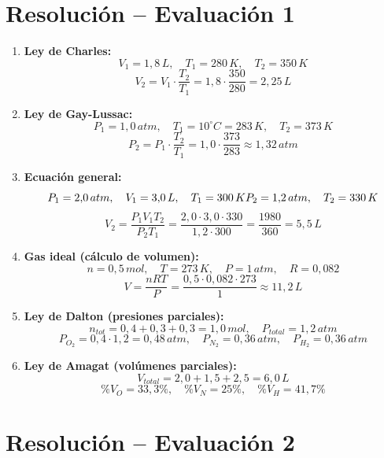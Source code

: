 \documentclass[a4paper,12pt]{article}
\begin{document}
\section*{Resolución – Evaluación 1}

\begin{enumerate}
\item \textbf{Ley de Charles:}
\[
V_1 = 1{,}8\,L,\quad T_1 = 280\,K,\quad T_2 = 350\,K
\]
\[
V_2 = V_1 \cdot \frac{T_2}{T_1} = 1{,}8 \cdot \frac{350}{280} = 2{,}25\,L
\]

\item \textbf{Ley de Gay-Lussac:}
\[
P_1 = 1{,}0\,atm,\quad T_1 = 10^\circ C = 283\,K,\quad T_2 = 373\,K
\]
\[
P_2 = P_1 \cdot \frac{T_2}{T_1} = 1{,}0 \cdot \frac{373}{283} \approx 1{,}32\,atm
\]

\item \textbf{Ecuación general:}
\[
P_1 = 2{,}0\,atm,\quad V_1 = 3{,}0\,L,\quad T_1 = 300\,K\\
P_2 = 1{,}2\,atm,\quad T_2 = 330\,K
\]
\[
V_2 = \frac{P_1 V_1 T_2}{P_2 T_1}
= \frac{2{,}0 \cdot 3{,}0 \cdot 330}{1{,}2 \cdot 300} = \frac{1980}{360} = 5{,}5\,L
\]

\item \textbf{Gas ideal (cálculo de volumen):}
\[
n = 0{,}5\,mol,\quad T = 273\,K,\quad P = 1\,atm,\quad R = 0{,}082
\]
\[
V = \frac{nRT}{P} = \frac{0{,}5 \cdot 0{,}082 \cdot 273}{1} \approx 11{,}2\,L
\]

\item \textbf{Ley de Dalton (presiones parciales):}
\[
n_{tot} = 0{,}4 + 0{,}3 + 0{,}3 = 1{,}0\,mol,\quad P_{total} = 1{,}2\,atm
\]
\[
P_{O_2} = 0{,}4 \cdot 1{,}2 = 0{,}48\,atm,\quad P_{N_2} = 0{,}36\,atm,\quad P_{H_2} = 0{,}36\,atm
\]

\item \textbf{Ley de Amagat (volúmenes parciales):}
\[
V_{total} = 2{,}0 + 1{,}5 + 2{,}5 = 6{,}0\,L
\]
\[
\%V_{O} = 33{,}3\%,\quad \%V_{N} = 25\%,\quad \%V_{H} = 41{,}7\%
\]

\end{enumerate}

\newpage

\section*{Resolución – Evaluación 2}
\end{document}
